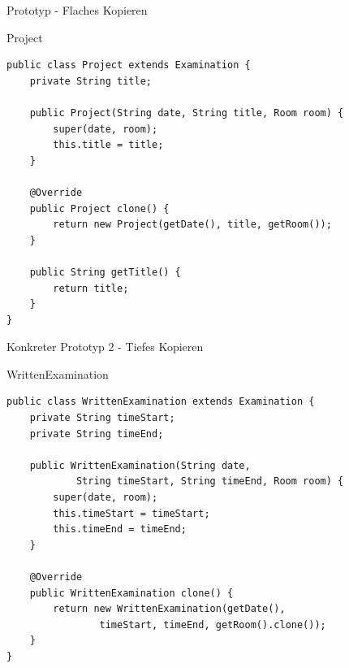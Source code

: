 \begin{frame}[fragile]{Prototyp - Flaches Kopieren}
	\begin{exampleblock}{Project}
 		\begin{lstlisting}
public class Project extends Examination {
	private String title;

	public Project(String date, String title, Room room) {
		super(date, room);
		this.title = title;
	}
	
	@Override
	public Project clone() {
		return new Project(getDate(), title, getRoom());
	}
	
	public String getTitle() {
		return title;
	}
}
        \end{lstlisting}
 	\end{exampleblock}
\end{frame}

\begin{frame}[fragile]{Konkreter Prototyp 2 - Tiefes Kopieren}
	\begin{exampleblock}{WrittenExamination}
        \begin{lstlisting}
public class WrittenExamination extends Examination {
	private String timeStart;
	private String timeEnd;
	
	public WrittenExamination(String date, 
			String timeStart, String timeEnd, Room room) {
		super(date, room);
		this.timeStart = timeStart;
		this.timeEnd = timeEnd;
	}
	
	@Override
	public WrittenExamination clone() {
		return new WrittenExamination(getDate(),  
				timeStart, timeEnd, getRoom().clone());
	}
}
        \end{lstlisting}
 	\end{exampleblock}
\end{frame}

